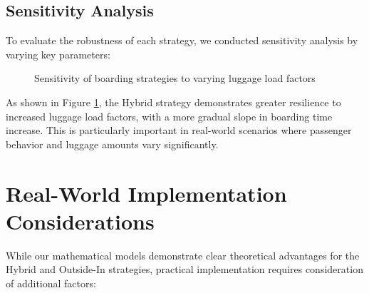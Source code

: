 \documentclass[12pt]{article}
\begin{document}
\subsection{Sensitivity Analysis}

To evaluate the robustness of each strategy, we conducted sensitivity analysis by varying key parameters:

\begin{figure}[h]
    \centering
    \caption{Sensitivity of boarding strategies to varying luggage load factors}
    \label{fig:sensitivity}
\end{figure}

As shown in Figure \ref{fig:sensitivity}, the Hybrid strategy demonstrates greater resilience to increased luggage load factors, with a more gradual slope in boarding time increase. This is particularly important in real-world scenarios where passenger behavior and luggage amounts vary significantly.

\section{Real-World Implementation Considerations}

While our mathematical models demonstrate clear theoretical advantages for the Hybrid and Outside-In strategies, practical implementation requires consideration of additional factors:
\end{document}
